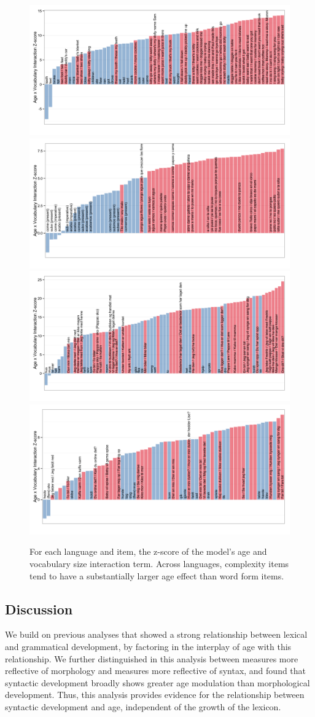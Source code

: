 \documentclass[10pt,letterpaper]{article}
\begin{document}
\begin{figure}[t]
\centering
\includegraphics[width=.49\textwidth]{plots/english_interactions}
\includegraphics[width=.49\textwidth]{plots/spanish_interactions} \\
\includegraphics[width=.49\textwidth]{plots/norwegian_interactions}
\includegraphics[width=.49\textwidth]{plots/danish_interactions}
\caption{\label{fig:interactions} For each language and item, the z-score of the model's age and vocabulary size interaction term. Across languages, complexity items tend to have a substantially larger age effect than word form items.}
\end{figure}

\subsection{Discussion}

We build on previous analyses that showed a strong relationship between lexical and grammatical development, by factoring in the interplay of age with this relationship. We further distinguished in this analysis between measures more reflective of morphology and measures more reflective of syntax, and found that syntactic development broadly shows greater age modulation than morphological development. Thus, this analysis provides evidence for the relationship between syntactic development and age, independent of the growth of the lexicon. 
\end{document}
